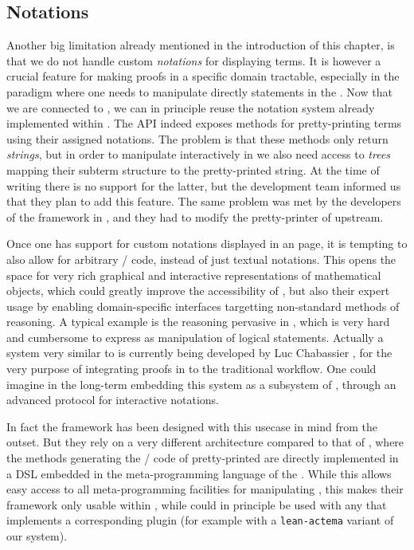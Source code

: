 \subsection{Notations}

Another big limitation already mentioned in the introduction of this chapter, is
that we do not handle custom \emph{notations} for displaying
terms. It is however a crucial feature for making proofs in a specific
domain tractable, especially in the  paradigm where one needs to
manipulate directly statements in the . Now that we are connected to
, we can in principle reuse the notation system already implemented
within . The   API indeed exposes methods for
pretty-printing  terms using their assigned notations. The problem is
that these methods only return \emph{strings}, but in order to manipulate
 interactively in  we also need access to \emph{trees}
mapping their subterm structure to the pretty-printed string. At the time of
writing there is no support for the latter, but the  development team
informed us that they plan to add this feature. The same problem was met by the
developers of the  framework in , and they had to
modify the pretty-printer of  upstream.

Once one has support for custom notations displayed in an  page, it is
tempting to also allow for arbitrary / code, instead of just
textual notations. This opens the space for very rich graphical and interactive
representations of mathematical objects, which could greatly improve the
accessibility of , but also their expert usage by enabling
domain-specific interfaces targetting non-standard methods of reasoning. A
typical example is the \emph{} reasoning pervasive in
\emph{}, which is very hard and cumbersome to express as
manipulation of logical statements. Actually a system very similar to
 is currently being developed by Luc Chabassier \cite{LucTalk},
for the very purpose of integrating  proofs in 
to the traditional  workflow. One could imagine in the
long-term embedding this system as a subsystem of , through an
advanced protocol for interactive notations.

In fact the  framework has been designed with this usecase in
mind from the outset. But they rely on a very different architecture compared to
that of , where the methods generating the / code
of pretty-printed  are directly implemented in a DSL embedded in the
meta-programming language of the . While this allows easy access to all
meta-programming facilities for manipulating , this makes their
framework only usable within , while  could in principle be
used with any  that implements a corresponding plugin (for example with a
\texttt{lean-actema} variant of our system).

